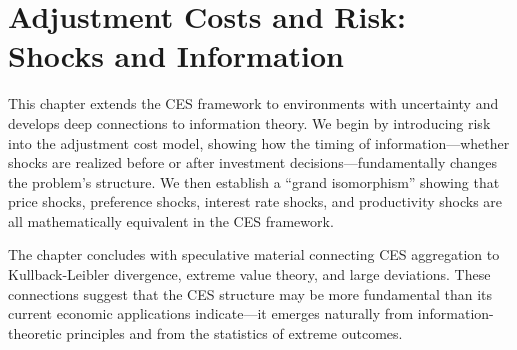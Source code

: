
\chapter{Adjustment Costs and Risk: Shocks and Information}

This chapter extends the CES framework to environments with uncertainty and develops deep connections to information theory. We begin by introducing risk into the adjustment cost model, showing how the timing of information---whether shocks are realized before or after investment decisions---fundamentally changes the problem's structure. We then establish a ``grand isomorphism'' showing that price shocks, preference shocks, interest rate shocks, and productivity shocks are all mathematically equivalent in the CES framework.

The chapter concludes with speculative material connecting CES aggregation to Kullback-Leibler divergence, extreme value theory, and large deviations. These connections suggest that the CES structure may be more fundamental than its current economic applications indicate---it emerges naturally from information-theoretic principles and from the statistics of extreme outcomes.







